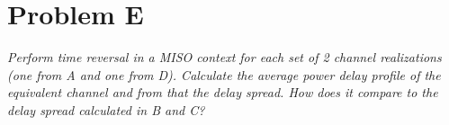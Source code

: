 \section{Problem E}
\textit{Perform time reversal in a MISO context for each set of 2 channel realizations (one from A and one from D). Calculate the average power delay profile of the equivalent channel and from that the delay spread. How does it compare to the delay spread calculated in B and C?}